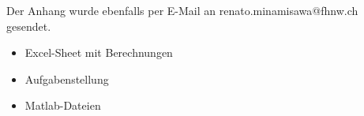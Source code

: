 Der Anhang wurde ebenfalls per E-Mail an renato.minamisawa@fhnw.ch gesendet.

\begin{itemize}
\item Excel-Sheet mit Berechnungen
\item Aufgabenstellung
\item Matlab-Dateien
\end{itemize}